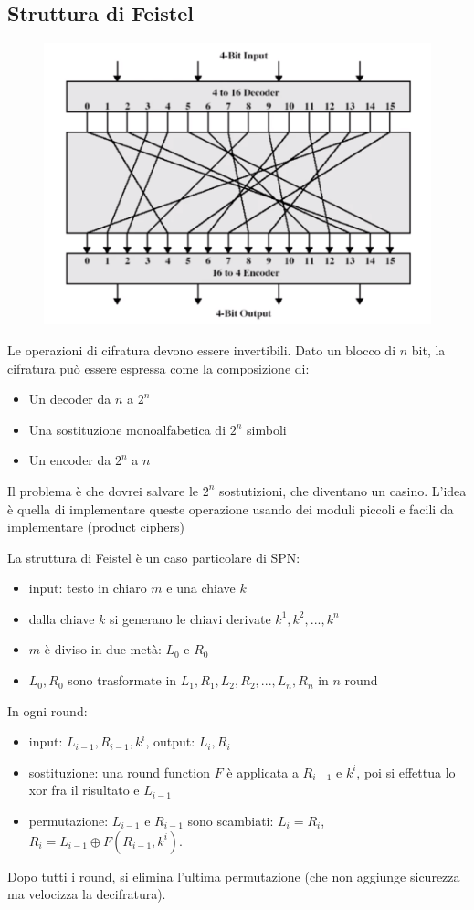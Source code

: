 \subsection*{Struttura di Feistel}

\begin{figure}[h]
	\centering
	\includegraphics[width=0.85\linewidth]{immagini/img44}
\end{figure}
Le operazioni di cifratura devono essere invertibili. Dato un blocco di $n$ bit, la cifratura può essere espressa come la composizione di:
\begin{itemize}
	\item Un decoder da $n$ a $2^n$
	\item Una sostituzione monoalfabetica di $2^n$ simboli
	\item Un encoder da $2^n$ a $n$
\end{itemize}
Il problema è che dovrei salvare le $2^n$ sostutizioni, che diventano un casino.
L'idea è quella di implementare queste operazione usando dei moduli piccoli e facili da implementare (product ciphers)

La struttura di Feistel è un caso particolare di SPN:
\begin{itemize}
	\item input: testo in chiaro $m$ e una chiave $k$
	\item dalla chiave $k$ si generano le chiavi derivate $k^1, k^2, ..., k^n$
	\item $m$ è diviso in due metà: $L_0$ e $R_0$
	\item $L_0,R_0$ sono trasformate in $L_1,R_1, L_2,R_2, ..., L_n,R_n$ in $n$ round
\end{itemize}
In ogni round:
\begin{itemize}
	\item input: $L_{i-1}, R_{i-1}, k^i$, output: $L_i,R_i$
	\item sostituzione: una round function $F$ è applicata a $R_{i-1}$ e $k^i$, poi si effettua lo xor fra il risultato e $L_{i-1}$
	\item permutazione: $L_{i-1}$ e $R_{i-1}$ sono scambiati: $L_i=R_i$, $R_i=L_{i-1} \oplus F(R_{i-1}, k^i)$.
\end{itemize}
Dopo tutti i round, si elimina l'ultima permutazione (che non aggiunge sicurezza ma velocizza la decifratura).

